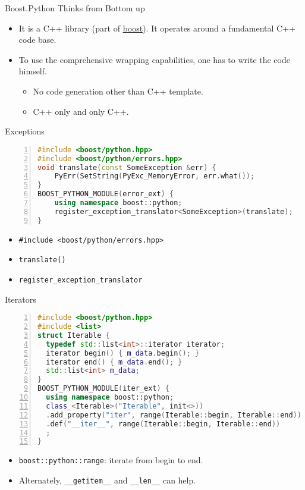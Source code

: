 \documentclass[dvips,xcolor=pst,14pt]{beamer}
\begin{document}
\begin{frame}{
%
Boost.Python Thinks from Bottom up
%
}
\begin{itemize}
\item It is a C++ library (part of \href{http://boost.org/}{\alert{boost}}).
It operates around a fundamental C++ code base.
\item To use the comprehensive wrapping capabilities, one has to write the code
himself.
\begin{itemize}
  \item No code generation other than C++ template.
  \item C++ only and only C++.
\end{itemize}
\end{itemize}
\end{frame}

\begin{frame}[fragile]{
%
Exceptions
%
}
\begin{lstlisting}[basicstyle=\scriptsize\ttfamily,language=c++,numbers=left]
#include <boost/python.hpp>
#include <boost/python/errors.hpp>
void translate(const SomeException &err) {
    PyErr(SetString(PyExc_MemoryError, err.what());
}
BOOST_PYTHON_MODULE(error_ext) {
    using namespace boost::python;
    register_exception_translator<SomeException>(translate);
}
\end{lstlisting}
\begin{itemize}
\item \verb+#include <boost/python/errors.hpp>+
\item \verb+translate()+
\item \verb+register_exception_translator+
\end{itemize}
\end{frame}

\begin{frame}[fragile]{
%
Iterators
%
}
\begin{lstlisting}[basicstyle=\scriptsize\ttfamily,language=c++,numbers=left]
#include <boost/python.hpp>
#include <list>
struct Iterable {
  typedef std::list<int>::iterator iterator;
  iterator begin() { m_data.begin(); }
  iterator end() { m_data.end(); }
  std::list<int> m_data;
}
BOOST_PYTHON_MODULE(iter_ext) {
  using namespace boost::python;
  class_<Iterable>("Iterable", init<>))
  .add_property("iter", range(Iterable::begin, Iterable::end))
  .def("__iter__", range(Iterable::begin, Iterable::end))
  ;
}
\end{lstlisting}
\begin{itemize} \small
\item \verb+boost::python::range+: iterate from begin to end.
\item Alternately, \verb+__getitem__+ and \verb+__len__+ can help.
\end{itemize}
\end{frame}
\end{document}

